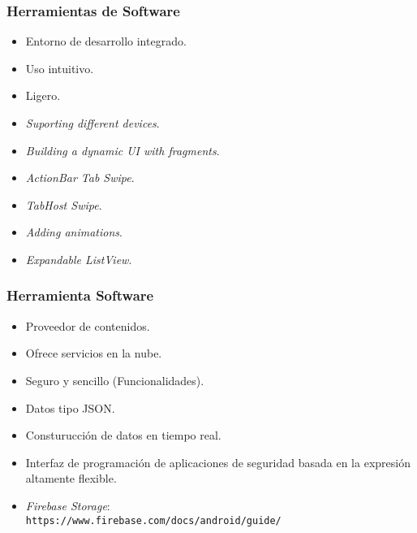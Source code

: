 \begin{frame}
	\frametitle{Herramientas de Software}
		\begin{itemize}
			\item Entorno de desarrollo integrado.
			\item Uso intuitivo.
			\item Ligero.
		\end{itemize}
	\endblock{}
		\begin{itemize}
			\item {\it Suporting different devices}.
			\item {\it Building a dynamic UI with fragments}.
			\item {\it ActionBar Tab Swipe}.
			\item {\it TabHost Swipe}.
			\item {\it Adding animations}.
			\item {\it Expandable ListView}.
		\end{itemize}
	\endblock{}
\end{frame}


\begin{frame}
	\frametitle{Herramienta Software}
		\begin{itemize}
			\item Proveedor de contenidos.
			\item Ofrece servicios en la nube.
			\item Seguro y sencillo (Funcionalidades).
			\item Datos tipo JSON.
			\item Consturucción de datos en tiempo real.
			\item Interfaz de programación de aplicaciones de seguridad basada en la expresión altamente flexible.
		\end{itemize}
	\endblock{}
		\begin{itemize}
			\item {\it Firebase Storage}: \\ {\texttt{https://www.firebase.com/docs/android/guide/}}
		\end{itemize}
	\endblock{}
\end{frame}


